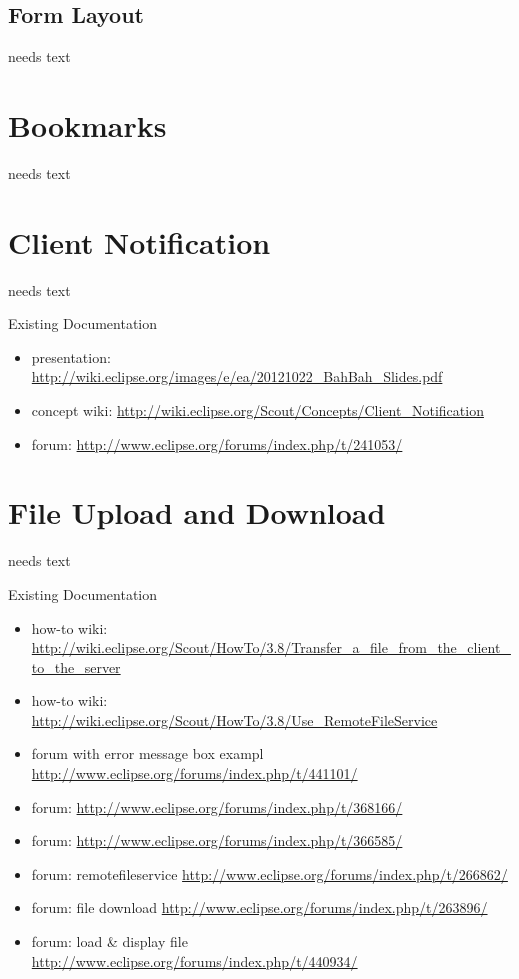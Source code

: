 \documentclass[a4paper,10pt,twoside]{book}
\begin{document}
{\section{Form Layout}
needs text


\chapter{Bookmarks}
needs text

\chapter{Client Notification}
needs text

\noindent Existing Documentation
\begin{itemize}
  \item presentation: \url{http://wiki.eclipse.org/images/e/ea/20121022_BahBah_Slides.pdf}
  \item concept wiki: \url{http://wiki.eclipse.org/Scout/Concepts/Client_Notification}
  \item forum: \url{http://www.eclipse.org/forums/index.php/t/241053/}
\end{itemize}
      
\chapter{File Upload and Download}
needs text

\noindent Existing Documentation
\begin{itemize}
  \item how-to wiki: \url{http://wiki.eclipse.org/Scout/HowTo/3.8/Transfer_a_file_from_the_client_to_the_server}
  \item how-to wiki: \url{http://wiki.eclipse.org/Scout/HowTo/3.8/Use_RemoteFileService}
  \item forum with error message box exampl \url{http://www.eclipse.org/forums/index.php/t/441101/}
  \item forum: \url{http://www.eclipse.org/forums/index.php/t/368166/}
  \item forum: \url{http://www.eclipse.org/forums/index.php/t/366585/}
  \item forum: remotefileservice \url{http://www.eclipse.org/forums/index.php/t/266862/}
  \item forum: file download \url{http://www.eclipse.org/forums/index.php/t/263896/}
  \item forum: load \& display file \url{http://www.eclipse.org/forums/index.php/t/440934/}
\end{itemize}

}
\end{document}
